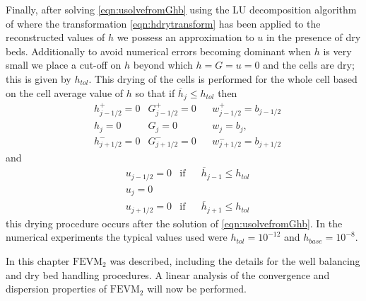 Finally, after solving \eqref{eqn:usolvefromGhb} using the LU decomposition algorithm of \citet{NumRecC-1996} where the transformation \eqref{eqn:hdrytransform} has been applied to the reconstructed values of $h$ we possess an approximation to $u$ in the presence of dry beds. Additionally to avoid numerical errors becoming dominant when $h$ is very small we place a cut-off on $h$ beyond which $h=G= u = 0$ and the cells are dry; this is given by $h_{tol}$. This drying of the cells is performed for the whole cell based on the cell average value of $h$ so that if $\overline{h}_j \le h_{tol}$ then
\begin{align*}
 & 	h^+_{j-1/2}  = 0   & 	G^+_{j-1/2}  = 0  & & 	w^+_{j-1/2}  = b_{j-1/2}   \\
 &	h_{j} = 0 & 	G_{j}  = 0  & 	&w_{j}  = b_{j},\\
 & 	h^-_{j+1/2}  = 0  & 	G^-_{j+1/2}  = 0 & 	&w^-_{j+1/2}  = b_{j+1/2} 
 \end{align*}
 and
 \begin{align*}
 & 	u_{j-1/2}  = 0  &\text{if}& &\overline{h}_{j-1}\le h_{tol} \\
 & 	u_{j}  = 0 \\
 & 	u_{j+1/2}  = 0  &\text{if}& &\overline{h}_{j+1} \le h_{tol}
\end{align*}
this drying procedure occurs after the solution of \eqref{eqn:usolvefromGhb}. In the numerical experiments the typical values used were $h_{tol} = 10^{-12}$ and $h_{base} = 10^{-8}$.

\medskip

In this chapter $\text{FEVM}_2$ was described, including the details for the well balancing and dry bed handling procedures. A linear analysis of the convergence and dispersion properties of $\text{FEVM}_2$ will now be performed. 
